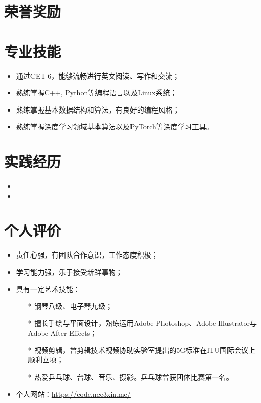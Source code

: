 \documentclass{resume}
\begin{document}
\section{荣誉奖励}



\section{专业技能}
\begin{itemize}[parsep=0.5ex]
  \item 通过CET-6，能够流畅进行英文阅读、写作和交流；
  \item 熟练掌握C++, Python等编程语言以及Linux系统；
  \item 熟练掌握基本数据结构和算法，有良好的编程风格；
  \item 熟练掌握深度学习领域基本算法以及PyTorch等深度学习工具。
\end{itemize}

\section{实践经历}
\begin{itemize}[parsep=0.5ex]
  \item {}
  \item {}
\end{itemize}

\section{个人评价}
\begin{itemize}[parsep=0.5ex]
  \item 责任心强，有团队合作意识，工作态度积极；
  \item 学习能力强，乐于接受新鲜事物；
  \item 具有一定艺术技能：
  \begin{itemize}[parsep=0.5ex]
    \item[*] 钢琴八级、电子琴九级；
    \item[*] 擅长手绘与平面设计，熟练运用Adobe Photoshop、Adobe Illustrator与Adobe After Effects；
    \item[*] 视频剪辑，曾剪辑技术视频协助实验室提出的5G标准在ITU国际会议上顺利立项；
    \item[*] 热爱乒乓球、台球、音乐、摄影。乒乓球曾获团体比赛第一名。
  \end{itemize}
  \item 个人网站：\href{https://code.nce3xin.me/}{https://code.nce3xin.me/}
\end{itemize}

%
%
\end{document}
